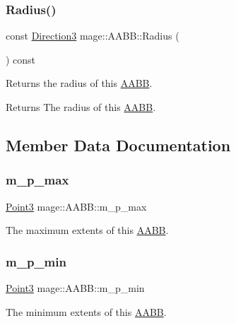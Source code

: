 \subsubsection{\texorpdfstring{Radius()}{Radius()}}
{\footnotesize\ttfamily const \hyperlink{structmage_1_1_direction3}{Direction3} mage\+::\+A\+A\+B\+B\+::\+Radius (\begin{DoxyParamCaption}{ }\end{DoxyParamCaption}) const\hspace{0.3cm}{\ttfamily [noexcept]}}

Returns the radius of this \hyperlink{structmage_1_1_a_a_b_b}{A\+A\+BB}.

\begin{DoxyReturn}{Returns}
The radius of this \hyperlink{structmage_1_1_a_a_b_b}{A\+A\+BB}. 
\end{DoxyReturn}


\subsection{Member Data Documentation}
\hypertarget{structmage_1_1_a_a_b_b_a51643192d891301df8d8d3f24abd2a27}{}\label{structmage_1_1_a_a_b_b_a51643192d891301df8d8d3f24abd2a27} 
\subsubsection{\texorpdfstring{m\+\_\+p\+\_\+max}{m\_p\_max}}
{\footnotesize\ttfamily \hyperlink{structmage_1_1_point3}{Point3} mage\+::\+A\+A\+B\+B\+::m\+\_\+p\+\_\+max}

The maximum extents of this \hyperlink{structmage_1_1_a_a_b_b}{A\+A\+BB}. \hypertarget{structmage_1_1_a_a_b_b_af5b7608aa0e332d70edfe0cb77bd27c2}{}\label{structmage_1_1_a_a_b_b_af5b7608aa0e332d70edfe0cb77bd27c2} 
\subsubsection{\texorpdfstring{m\+\_\+p\+\_\+min}{m\_p\_min}}
{\footnotesize\ttfamily \hyperlink{structmage_1_1_point3}{Point3} mage\+::\+A\+A\+B\+B\+::m\+\_\+p\+\_\+min}

The minimum extents of this \hyperlink{structmage_1_1_a_a_b_b}{A\+A\+BB}. 
